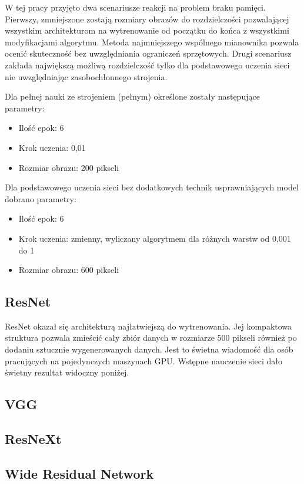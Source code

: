 \documentclass[12pt,a4paper,twoside,titlepage,openright]{book}
\begin{document}
W tej pracy przyjęto dwa scenariusze reakcji na problem braku pamięci. Pierwszy, zmniejszone zostają rozmiary obrazów do rozdzielczości pozwalającej wszystkim architekturom na wytrenowanie od początku do końca z wszystkimi modyfikacjami algorytmu. Metoda najmniejszego wspólnego mianownika pozwala ocenić skuteczność bez uwzględniania ograniczeń sprzętowych. Drugi scenariusz zakłada największą możliwą rozdzielczość tylko dla podstawowego uczenia sieci nie uwzględniając zasobochłonnego strojenia.

Dla pełnej nauki ze strojeniem (pełnym) określone zostały następujące parametry:
\begin{itemize}
\item Ilość epok: 6
\item Krok uczenia: 0,01
\item Rozmiar obrazu: 200 pikseli
\end{itemize}

Dla podstawowego uczenia sieci bez dodatkowych technik usprawniających model dobrano parametry:
\begin{itemize}
\item Ilość epok: 6
\item Krok uczenia: zmienny, wyliczany algorytmem dla różnych warstw od 0,001 do 1 
\item Rozmiar obrazu: 600 pikseli
\end{itemize}

\subsection{ResNet}
ResNet okazał się architekturą najłatwiejszą do wytrenowania. Jej kompaktowa struktura pozwala zmieścić cały zbiór danych w rozmiarze 500 pikseli również po dodaniu sztucznie wygenerowanych danych. Jest to świetna wiadomość dla osób pracujących na pojedynczych maszynach GPU. Wstępne nauczenie sieci dało świetny rezultat widoczny poniżej.

\subsection{VGG}

\subsection{ResNeXt}

\subsection{Wide Residual Network}
\end{document}
